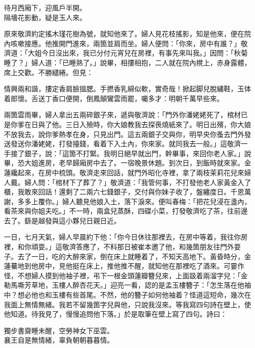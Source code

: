 \begin{myquote}
待月西廂下，迎風戶半開。\\隔墻花影動，疑是玉人來。
\end{myquote}

原來敬濟約定搖木瑾花樹為號，就知他來了。婦人見花枝搖影，知是他來，便在院內咳嗽接應。他推開門進來，兩箇並肩而坐。婦人便問：「你來，房中有誰？」敬濟道：「大姐今日沒出來，我已分付元宵兒在房裡，有事先來叫我。」因問：「秋菊睡了？」婦人道：「已睡熟了。」說畢，相摟相抱，二人就在院內櫈上，赤身露體，席上交歡。不勝繾綣。但見：

\begin{myquote}
情興兩和諧，摟定香肩臉搵腮。手撚香乳綿似軟，實奇哉！掀起脚兒脫繡鞋，玉体着郎懷。舌送丁香口便開，倒鳳顛鸞雲雨罷，囑多才：明朝千萬早些來。
\end{myquote}

兩箇雲雨畢，婦人拿出五兩碎銀子來，遞與敬濟說：「門外你潘姥姥死了，棺材已是你爹在日與了他。三日入殮時，你大娘教我去探䘮燒紙來了。明日出殯，你大娘不放我去，說你爹熱孝在身，只見出門。這五兩銀子交與你，明早央你蚤去門外發送發送你潘姥姥，打發擡錢，看着下入土內，你來家。就同我去一般。」{}這敬濟一手接了銀子，說：「這箇不打緊。我明日絕早就出門，幹畢事，來回你老人家。」說畢，恐大姐進房，老早歸廂房中去了。一宿晚景休題。到次日，到飯時就來家。金蓮纔起來，在房中梳頭。敬濟走來回話，就門外昭化寺裡，拿了兩枝茉莉花兒來婦人戴。婦人問：「棺材下了葬了？」敬濟道：「我管何事，不打發他老人家黃金入了櫃，我敢來回話！還剩了二兩六七錢銀子，交付與你妹子收了，盤纏度日。千恩萬謝，多多上覆你。」婦人聽見他娘入土，落下淚來。{}便叫春梅：「把花兒浸在盞內，看茶來與你姐夫吃。」不一時，兩盒兒蒸酥，四碟小菜，打發敬濟吃了茶，往前邊去了。繇是越發與這小夥兒日親日近。

一日，七月天氣，婦人早晨約下他：「你今日休往那裡去，在房中等着，我往你房裡，和你頑耍。」這敬濟答應了，不料那日被崔本邀了他，和幾箇朋友往門外耍子。去了一日，吃的大醉來家，倒在床上就睡着了，不知天高地下。黃昏時分，金蓮驀地到他房中，見他挺在床上，推他推不醒，就知他在那裡吃了酒來。可霎作怪，不想婦人摸到他袖子裡，弔下一根金頭蓮瓣簪兒來，上面趿着兩溜字兒：「金勒馬嘶芳草地，玉樓人醉杏花天。」{}迎亮一看，認的是孟玉樓簪子：「怎生落在他袖中？想必他也和玉樓有些首尾。不然，他的簪子如何他袖着？怪道這短命，幾次在我面上無情無緒。我若不留幾箇字兒與他，只說我沒來。等我寫四句詩在壁上，使他知道。待我見了，慢慢追問他下落。」於是取筆在壁上寫了四句。詩曰：

\begin{myquote}
獨步書齋睡未醒，空勞神女下巫雲。\\襄王自是無情緒，辜負朝朝暮暮情。
\end{myquote}

